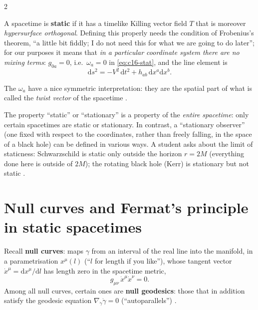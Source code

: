 \begin{paracol}{2}
\begin{definition}\label{def:c16-static}
A spacetime is \textbf{static} if it has a timelike Killing vector field $T$ that is moreover \emph{hypersurface orthogonal}. Defining this properly needs the condition of Frobenius's theorem, ``a little bit fiddly; I do not need this for what we are going to do later''; for our purposes it means that \emph{in a particular coordinate system there are no mixing terms}: $g_{0a}=0$, i.e.\ $\omega_a=0$ in \eqref{eq:c16-stat}, and the line element is
\[
  \mathrm ds^2=-V^2\,\mathrm dt^2+h_{ab}\,\mathrm dx^a\mathrm dx^b.
\]
\end{definition}
The $\omega_a$ have a nice symmetric interpretation: they are the spatial part of what is called the \emph{twist vector} of the spacetime .
\begin{coursenote}
The property ``static'' or ``stationary'' is a property of the \emph{entire spacetime}: only certain spacetimes are static or stationary. In contrast, a ``stationary observer'' (one fixed with respect to the coordinates, rather than freely falling, in the space of a black hole) can be defined in various ways. A student asks about the limit of staticness: Schwarzschild is static only outside the horizon $r=2M$ (everything done here is outside of $2M$); the rotating black hole (Kerr) is stationary but not static .
\end{coursenote}

\section{Null curves and Fermat's principle in static spacetimes}\label{sec:c16-fermat}

Recall \textbf{null curves}: maps $\gamma$ from an interval of the real line into the manifold, in a parametrisation $x^\mu(l)$ (``$l$ for length if you like''), whose tangent vector $\dot x^\mu=\mathrm dx^\mu/\mathrm dl$ has length zero in the spacetime metric,
\[
  g_{\mu\nu}\,\dot x^\mu\dot x^\nu=0.
\]
Among all null curves, certain ones are \textbf{null geodesics}: those that in addition satisfy the geodesic equation $\nabla_{\dot\gamma}\dot\gamma=0$ (``autoparallels'') .


\end{paracol}
